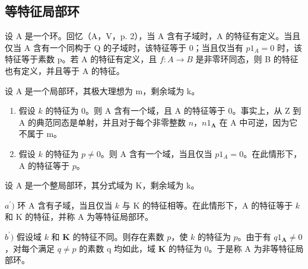 \subsection{等特征局部环}

设 A 是一个环。回忆（A，V，p. 2），当 A 含有子域时，A 的特征有定义。当且仅当 A 含有一个同构于 Q 的子域时，该特征等于 0；当且仅当有 \(p1_{A} = 0\) 时，该特征等于素数 p。若 A 的特征有定义，且 \(f: A \to B\) 是非零环同态，则 B 的特征也有定义，并且等于 A 的特征。

设 A 是一个局部环，其极大理想为 m，剩余域为 k。

\begin{enumerate}
\def\labelenumi{\alph{enumi})}
\item
  假设 \(k\) 的特征为 0。则 A 含有一个域，且 A 的特征等于 0。事实上，从 Z 到 A 的典范同态是单射，并且对于每个非零整数 \(n\)，\(n1_{\mathbf{A}}\) 在 A 中可逆，因为它不属于 m。
\item
  假设 \(k\) 的特征为 \(p \neq 0\)。则 A 含有一个域，当且仅当 \(p1_{A} = 0\)。在此情形下，A 的特征等于 \(p\)。
\end{enumerate}

设 A 是一个整局部环，其分式域为 K，剩余域为 k。

\(a^{\prime})\) 环 A 含有子域，当且仅当 \(k\) 与 K 的特征相等。在此情形下，A 的特征等于 \(k\) 和 K 的特征，并称 A 为等特征局部环。

\(b^{\prime})\) 假设域 \(k\) 和 \(\mathbf{K}\) 的特征不同。则存在素数 \(p\)，使 \(k\) 的特征为 \(p\)。由于有 \(q1_{\mathbf{A}} \neq 0\)，对每个满足 \(q \neq p\) 的素数 q 均如此，域 \(\mathbf{K}\) 的特征为 0。于是称 A 为非等特征局部环。

